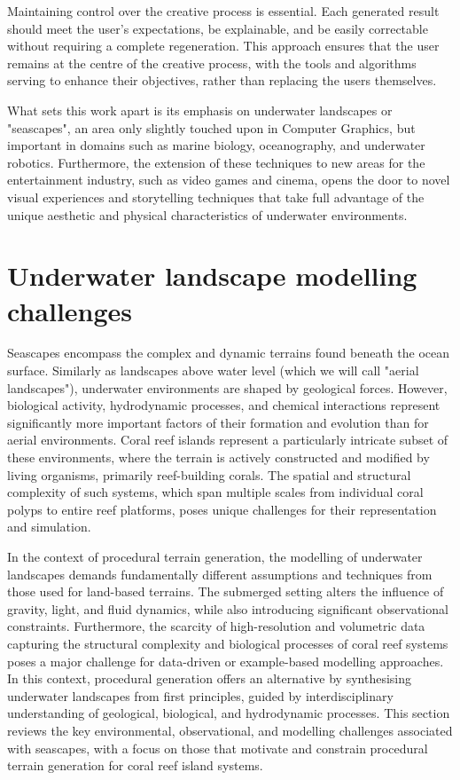 Maintaining control over the creative process is essential. Each generated result should meet the user's expectations, be explainable, and be easily correctable without requiring a complete regeneration. This approach ensures that the user remains at the centre of the creative process, with the tools and algorithms serving to enhance their objectives, rather than replacing the users themselves.

What sets this work apart is its emphasis on underwater landscapes or "seascapes", an area only slightly touched upon in Computer Graphics, but important in domains such as marine biology, oceanography, and underwater robotics. Furthermore, the extension of these techniques to new areas for the entertainment industry, such as video games and cinema, opens the door to novel visual experiences and storytelling techniques that take full advantage of the unique aesthetic and physical characteristics of underwater environments.




\section{Underwater landscape modelling challenges}
Seascapes encompass the complex and dynamic terrains found beneath the ocean surface. Similarly as landscapes above water level (which we will call "aerial landscapes"), underwater environments are shaped by geological forces. However, biological activity, hydrodynamic processes, and chemical interactions represent significantly more important factors of their formation and evolution than for aerial environments. Coral reef islands represent a particularly intricate subset of these environments, where the terrain is actively constructed and modified by living organisms, primarily reef-building corals. The spatial and structural complexity of such systems, which span multiple scales from individual coral polyps to entire reef platforms, poses unique challenges for their representation and simulation.

In the context of procedural terrain generation, the modelling of underwater landscapes demands fundamentally different assumptions and techniques from those used for land-based terrains. The submerged setting alters the influence of gravity, light, and fluid dynamics, while also introducing significant observational constraints. Furthermore, the scarcity of high-resolution and volumetric data capturing the structural complexity and biological processes of coral reef systems poses a major challenge for data-driven or example-based modelling approaches. In this context, procedural generation offers an alternative by synthesising underwater landscapes from first principles, guided by interdisciplinary understanding of geological, biological, and hydrodynamic processes. This section reviews the key environmental, observational, and modelling challenges associated with seascapes, with a focus on those that motivate and constrain procedural terrain generation for coral reef island systems.


